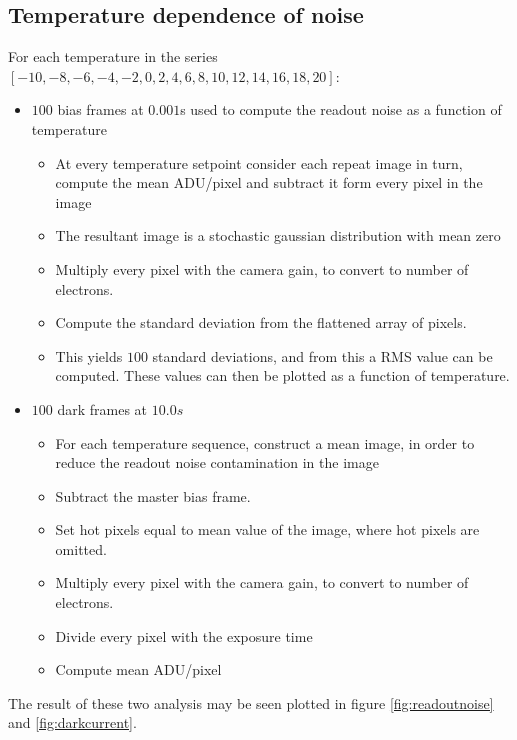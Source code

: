 \documentclass[../main.tex]{subfiles}
\begin{document}
		\subsection{Temperature dependence of noise}\label{sec:rondc}
		For each temperature in the series $[-10, -8, -6, -4, -2, 0, 2, 4, 6, 8, 10, 12, 14, 16, 18, 20]$:
			\begin{itemize}
				\item $100$ bias frames at $0.001$s used to compute the readout noise as a function of temperature
				\begin{itemize}
					\item At every temperature setpoint consider each repeat image in turn, compute the mean ADU/pixel and subtract it form every pixel in the image
					\item The resultant image is a stochastic gaussian distribution with mean zero
					\item Multiply every pixel with the camera gain, to convert to number of electrons.
					\item Compute the standard deviation from the flattened array of pixels.
					\item This yields $100$ standard deviations, and from this a RMS value can be computed. These values can then be plotted as a function of temperature.
				\end{itemize} 
				\item $100$ dark frames at $10.0s$
				\begin{itemize}
					\item For each temperature sequence, construct a mean image, in order to reduce the readout noise contamination in the image
					\item Subtract the master bias frame.
					\item Set hot pixels equal to mean value of the image, where hot pixels are omitted.
					\item Multiply every pixel with the camera gain, to convert to number of electrons.
					\item Divide every pixel with the exposure time
					\item Compute mean ADU/pixel
				\end{itemize}
			\end{itemize}
		The result of these two analysis may be seen plotted in figure \ref{fig:readoutnoise}	and \ref{fig:darkcurrent}.
		
\end{document}
